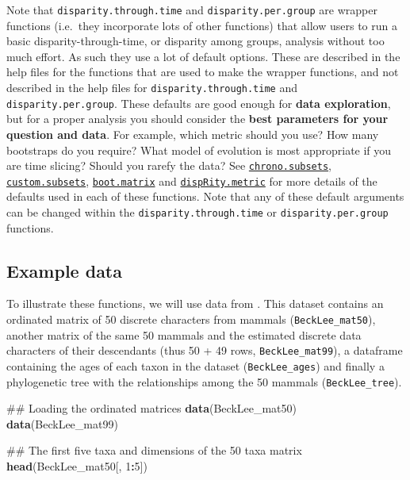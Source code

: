 \documentclass[]{book}
\newenvironment{Shaded}{\begin{snugshade}}{\end{snugshade}}
\newcommand{\KeywordTok}[1]{\textcolor[rgb]{0.13,0.29,0.53}{\textbf{#1}}}
\newcommand{\DecValTok}[1]{\textcolor[rgb]{0.00,0.00,0.81}{#1}}
\newcommand{\OperatorTok}[1]{\textcolor[rgb]{0.81,0.36,0.00}{\textbf{#1}}}
\newcommand{\NormalTok}[1]{#1}
\theoremstyle{definition}
\theoremstyle{definition}
\theoremstyle{definition}
\theoremstyle{remark}
\begin{document}
Note that \texttt{disparity.through.time} and
\texttt{disparity.per.group} are wrapper functions (i.e.~they
incorporate lots of other functions) that allow users to run a basic
disparity-through-time, or disparity among groups, analysis without too
much effort. As such they use a lot of default options. These are
described in the help files for the functions that are used to make the
wrapper functions, and not described in the help files for
\texttt{disparity.through.time} and \texttt{disparity.per.group}. These
defaults are good enough for \textbf{data exploration}, but for a proper
analysis you should consider the \textbf{best parameters for your
question and data}. For example, which metric should you use? How many
bootstraps do you require? What model of evolution is most appropriate
if you are time slicing? Should you rarefy the data? See
\protect\hyperlink{time-slicing}{\texttt{chrono.subsets}},
\protect\hyperlink{customised-subsets}{\texttt{custom.subsets}},
\protect\hyperlink{bootstraps-and-rarefactions}{\texttt{boot.matrix}}
and \protect\hyperlink{disparity-metrics}{\texttt{dispRity.metric}} for
more details of the defaults used in each of these functions. Note that
any of these default arguments can be changed within the
\texttt{disparity.through.time} or \texttt{disparity.per.group}
functions.

\hypertarget{example-data}{\subsection{Example
data}\label{example-data}}

To illustrate these functions, we will use data from
\citet{beckancient2014}. This dataset contains an ordinated matrix of 50
discrete characters from mammals (\texttt{BeckLee\_mat50}), another
matrix of the same 50 mammals and the estimated discrete data characters
of their descendants (thus 50 + 49 rows, \texttt{BeckLee\_mat99}), a
dataframe containing the ages of each taxon in the dataset
(\texttt{BeckLee\_ages}) and finally a phylogenetic tree with the
relationships among the 50 mammals (\texttt{BeckLee\_tree}).

\begin{Shaded}
\begin{Highlighting}[]
\NormalTok{## Loading the ordinated matrices}
\KeywordTok{data}\NormalTok{(BeckLee_mat50)}
\KeywordTok{data}\NormalTok{(BeckLee_mat99)}

\NormalTok{## The first five taxa and dimensions of the 50 taxa matrix}
\KeywordTok{head}\NormalTok{(BeckLee_mat50[, }\DecValTok{1}\OperatorTok{:}\DecValTok{5}\NormalTok{])}
\end{Highlighting}
\end{Shaded}
\end{document}
